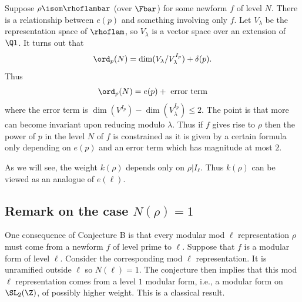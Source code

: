 \documentclass{report}
\begin{document}
Suppose $\rho\isom\rhoflambar$ (over $\Fbar$) for some newform
$f$ of level $N$.  There is a relationship  between $e(p)$
and something involving only $f$.
Let $V_{\lambda}$ be the representation space of $\rhoflam$,
so $V_{\lambda}$ is a vector space over an extension of $\Ql$.
It turns out that
$$\ord_p(N)=\dim(V_{\lambda}/V_{\lambda}^{I_p})+\delta(p).$$
Thus
   $$\ord_p(N)=e(p)+\text{ error term}$$
where the error term is
   $\dim(V^{I_p})-\dim(V_{\lambda}^{I_p})\leq 2$.
The point is that more can become invariant upon  reducing
modulo $\lambda$.  Thus if $f$ gives rise to
$\rho$ then the power of $p$ in the
level $N$ of $f$ is constrained as it is given by a
certain formula only depending on $e(p)$ and an error
term which has magnitude at most $2$.

As we will see, the weight $k(\rho)$ depends only
on $\rho|I_{\ell}$.  Thus $k(\rho)$ can be viewed as
an analogue of $e(\ell)$.

\subsection{Remark on the case $N(\rho)=1$}
One consequence of Conjecture B is that every modular
mod $\ell$ representation $\rho$ must come from a newform $f$ of
level prime to $\ell$.  Suppose that $f$ is a modular form
of level $\ell$.   Consider the corresponding
mod $\ell$ representation.
It is unramified outside $\ell$ so $N(\ell)=1$. The conjecture then
implies that this mod $\ell$ representation
comes from a level $1$ modular
form, i.e., a modular form on $\SL_2(\Z)$,
of possibly higher weight.  This is a classical result.
\end{document}
